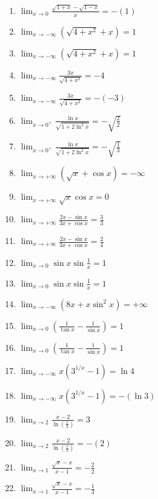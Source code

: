 \documentclass[11pt,a4paper]{article}
\begin{document}
\begin{enumerate}
\item $\displaystyle \lim_{x \to 0} \frac{\sqrt{1 + x} - \sqrt{1 - x}}{x} = -\left(1\right)$
\item $\displaystyle \lim_{x \to -\infty} \left(\sqrt{4 + x^{2}} + x\right) = 1$
\item $\displaystyle \lim_{x \to -\infty} \left(\sqrt{4 + x^{2}} + x\right) = 1$
\item $\displaystyle \lim_{x \to -\infty} \frac{3x}{\sqrt{4 + x^{2}}} = -4$
\item $\displaystyle \lim_{x \to -\infty} \frac{3x}{\sqrt{4 + x^{2}}} = -\left(-3\right)$
\item $\displaystyle \lim_{x \to 0^{+}} \frac{\ln x}{\sqrt{1 + 2\ln^{2} x}} = -\sqrt{\frac{2}{2}}$
\item $\displaystyle \lim_{x \to 0^{+}} \frac{\ln x}{\sqrt{1 + 2\ln^{2} x}} = -\sqrt{\frac{1}{3}}$
\item $\displaystyle \lim_{x \to +\infty} (\sqrt{x} + \cos x) = -\infty$
\item $\displaystyle \lim_{x \to +\infty} \sqrt{x}\cos x = 0$
\item $\displaystyle \lim_{x \to +\infty} \frac{2x - \sin x}{3x + \cos x} = \frac{3}{3}$
\item $\displaystyle \lim_{x \to +\infty} \frac{2x - \sin x}{3x + \cos x} = \frac{2}{4}$
\item $\displaystyle \lim_{x \to 0} \sin x \sin\frac{1}{x} = 1$
\item $\displaystyle \lim_{x \to 0} \sin x \sin\frac{1}{x} = 1$
\item $\displaystyle \lim_{x \to -\infty} (8x + x\sin^{2} x) = +\infty$
\item $\displaystyle \lim_{x \to 0} \left(\frac{1}{\tan x} - \frac{1}{\sin x}\right) = 1$
\item $\displaystyle \lim_{x \to 0} \left(\frac{1}{\tan x} - \frac{1}{\sin x}\right) = 1$
\item $\displaystyle \lim_{x \to -\infty} x\left(3^{1/x} - 1\right) = \ln 4$
\item $\displaystyle \lim_{x \to -\infty} x\left(3^{1/x} - 1\right) = -\left(\ln 3\right)$
\item $\displaystyle \lim_{x \to 2} \frac{x - 2}{\ln\left(\frac{x}{2}\right)} = 3$
\item $\displaystyle \lim_{x \to 2} \frac{x - 2}{\ln\left(\frac{x}{2}\right)} = -\left(2\right)$
\item $\displaystyle \lim_{x \to 1} \frac{\sqrt{x} - x}{x - 1} = -\frac{2}{2}$
\item $\displaystyle \lim_{x \to 1} \frac{\sqrt{x} - x}{x - 1} = -\frac{1}{3}$

\end{enumerate}
\end{document}
